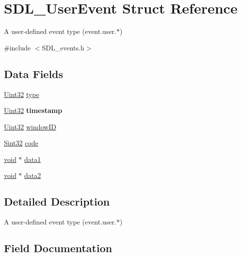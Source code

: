 \hypertarget{struct_s_d_l___user_event}{}\section{S\+D\+L\+\_\+\+User\+Event Struct Reference}
\label{struct_s_d_l___user_event}


A user-\/defined event type (event.\+user.$\ast$)  




{\ttfamily \#include $<$S\+D\+L\+\_\+events.\+h$>$}

\subsection*{Data Fields}
\begin{DoxyCompactItemize}
\item 
\hyperlink{_s_d_l__stdinc_8h_add440eff171ea5f55cb00c4a9ab8672d}{Uint32} \hyperlink{struct_s_d_l___user_event_aa40a9b05c3154032b9f2d7220e9f08dc}{type}
\item 
\hyperlink{_s_d_l__stdinc_8h_add440eff171ea5f55cb00c4a9ab8672d}{Uint32} {\bfseries timestamp}\hypertarget{struct_s_d_l___user_event_abf1ed7edeab81db9c05d899836a44a2f}{}\label{struct_s_d_l___user_event_abf1ed7edeab81db9c05d899836a44a2f}

\item 
\hyperlink{_s_d_l__stdinc_8h_add440eff171ea5f55cb00c4a9ab8672d}{Uint32} \hyperlink{struct_s_d_l___user_event_a78d9995068d6f40cd78bb8db7351b0a1}{window\+ID}
\item 
\hyperlink{_s_d_l__stdinc_8h_a7a90b941db9d4582e9ad7abb9940ff7e}{Sint32} \hyperlink{struct_s_d_l___user_event_ad8f8a20f97a86a504de0f82933da62ab}{code}
\item 
\hyperlink{_s_d_l__audio_8h_a52835ae37c4bb905b903cbaf5d04b05f}{void} $\ast$ \hyperlink{struct_s_d_l___user_event_a926be0f9566b1f30625f0dc8a6e43df9}{data1}
\item 
\hyperlink{_s_d_l__audio_8h_a52835ae37c4bb905b903cbaf5d04b05f}{void} $\ast$ \hyperlink{struct_s_d_l___user_event_a4e0b4defdbf7d4f26abc76d6c22b5f14}{data2}
\end{DoxyCompactItemize}


\subsection{Detailed Description}
A user-\/defined event type (event.\+user.$\ast$) 

\subsection{Field Documentation}
